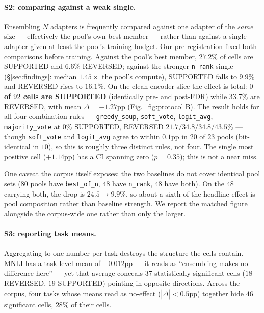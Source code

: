 \documentclass[11pt]{article}
\begin{document}
\paragraph{S2: comparing against a weak single.} Ensembling $N$ adapters is frequently compared against one adapter of the \emph{same} size --- effectively the pool's own best member --- rather than against a single adapter given at least the pool's training budget. Our pre-registration fixed both comparisons before training. Against the pool's best member, $27.2\%$ of cells are SUPPORTED and $6.6\%$ REVERSED; against the stronger \texttt{n\_rank} single (\S\ref{sec:findings}: median $1.45\times$ the pool's compute), SUPPORTED falls to $9.9\%$ and REVERSED rises to $16.1\%$. On the clean encoder slice the effect is total: \textbf{$0$ of $92$ cells are SUPPORTED} (identically pre- and post-FDR) while $33.7\%$ are REVERSED, with mean $\Delta=-1.27$pp (Fig.~\ref{fig:protocol}B). The result holds for all four combination rules --- \texttt{greedy\_soup}, \texttt{soft\_vote}, \texttt{logit\_avg}, \texttt{majority\_vote} at $0\%$ SUPPORTED, REVERSED $21.7/34.8/34.8/43.5\%$ --- though \texttt{soft\_vote} and \texttt{logit\_avg} agree to within $0.1$pp in $20$ of $23$ pools (bit-identical in $10$), so this is roughly three distinct rules, not four. The single most positive cell ($+1.14$pp) has a CI spanning zero ($p{=}0.35$); this is not a near miss.

One caveat the corpus itself exposes: the two baselines do not cover identical pool sets ($80$ pools have \texttt{best\_of\_n}, $48$ have \texttt{n\_rank}, $48$ have both). On the $48$ carrying both, the drop is $24.5\to9.9\%$, so about a sixth of the headline effect is pool composition rather than baseline strength. We report the matched figure alongside the corpus-wide one rather than only the larger.

\paragraph{S3: reporting task means.} Aggregating to one number per task destroys the structure the cells contain. MNLI has a task-level mean of $-0.012$pp --- it reads as ``ensembling makes no difference here'' --- yet that average conceals $37$ statistically significant cells ($18$ REVERSED, $19$ SUPPORTED) pointing in opposite directions. Across the corpus, four tasks whose means read as no-effect ($|\overline{\Delta}|<0.5$pp) together hide $46$ significant cells, $28\%$ of their cells.
\end{document}
